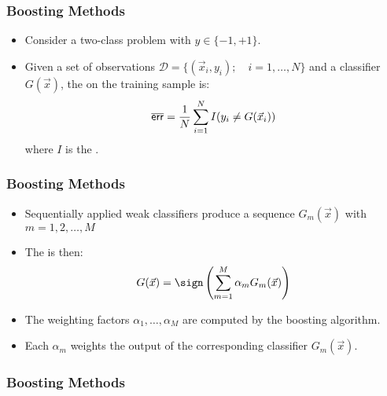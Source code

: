 \begin{frame}
  \frametitle{Boosting Methods \cont}

  \begin{itemize}
    \item Consider a two-class problem with $y \in \{ -1, +1\}$. \\[.25cm] %
    \item Given a set of observations $\mathcal{D} = \{(\vec{x}_i, y_i); \quad i=1,\ldots,N\}$ and a classifier $G(\vec x)$, the  on the training sample is:
      \begin{displaymath}
        {\mathop{\overline{\mathsf{err}}}} = \frac{1}{N} \sum_{i=1}^N I(y_i \neq G(\vec{x}_i))
      \end{displaymath}
      where $I$ is the .
  \end{itemize}
\end{frame}


\begin{frame}
  \frametitle{Boosting Methods \cont}

  \begin{itemize}
    \item Sequentially applied weak classifiers produce a sequence $G_m(\vec x)$ with $m=1,2,\ldots,M$ %
    \item The  is then:
      \begin{displaymath}
        G(\vec x) = \sign \left( \sum_{m=1}^M \alpha_m G_m(\vec x) \right)
      \end{displaymath}
    \item The weighting factors $\alpha_1, \ldots, \alpha_M$ are computed by the boosting algorithm. %
    \item Each $\alpha_m$ weights the output of the corresponding classifier $G_m(\vec x)$.
  \end{itemize}
\end{frame}


\begin{frame}
  \frametitle{Boosting Methods}


  \begin{center}
    \resizebox{.35\linewidth}{!}{
      
    }
  \end{center}
\end{frame}


